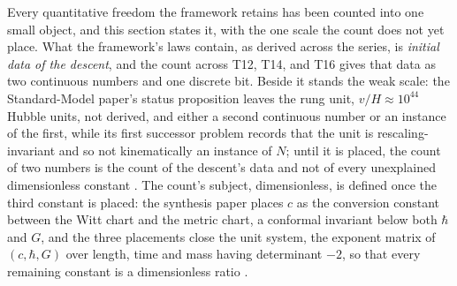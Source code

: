 \documentclass[11pt]{article}
\theoremstyle{definition}
\begin{document}
Every quantitative freedom the framework retains has been counted into one small object, and this section states it, with the one scale the count does not yet place. What the framework's laws contain, as derived across the series, is \emph{initial data of the descent}, and the count across T12, T14, and T16 gives that data as two continuous numbers and one discrete bit. Beside it stands the weak scale: the Standard-Model paper's status proposition leaves the rung unit, $v/H \approx 10^{44}$ Hubble units, not derived, and either a second continuous number or an instance of the first, while its first successor problem records that the unit is rescaling-invariant and so not kinematically an instance of $N$; until it is placed, the count of two numbers is the count of the descent's data and not of every unexplained dimensionless constant \cite{ButlerT12}. The count's subject, dimensionless, is defined once the third constant is placed: the synthesis paper places $c$ as the conversion constant between the Witt chart and the metric chart, a conformal invariant below both $\hbar$ and $G$, and the three placements close the unit system, the exponent matrix of $(c, \hbar, G)$ over length, time and mass having determinant $-2$, so that every remaining constant is a dimensionless ratio \cite{ButlerT16}.
\end{document}
